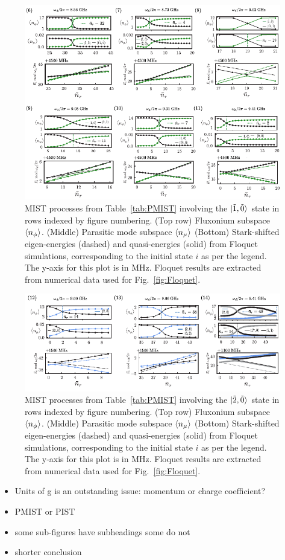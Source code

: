 \documentclass[%
reprint,
superscriptaddress,
 amsmath,amssymb,
 aps,
 prx,
longbibliography,
floatfix,
]{revtex4-2}
\begin{document}
\begin{figure}
    \centering
    \includegraphics[width=1.0\textwidth]{Supp_Fig/Trans1.pdf}
    \caption{MIST processes from Table~\ref{tab:PMIST} involving the $\ket{\tilde{1},\tilde{0}}$ state in rows indexed by figure numbering. (Top row) Fluxonium subspace $\braket{n_\phi}$. (Middle) Parasitic mode subspace $\braket{n_\mu}$ (Bottom) Stark-shifted eigen-energies (dashed) and quasi-energies (solid) from Floquet simulations, corresponding to the initial state $i$ as per the legend. The y-axis for this plot is in MHz. Floquet results are extracted from numerical data used for Fig.~\ref{fig:Floquet}.}
    \label{fig:Trans1}
\end{figure}
\begin{figure}
    \centering
    \includegraphics[width=1.0\textwidth]{Supp_Fig/Trans2.pdf}
    \caption{MIST processes from Table~\ref{tab:PMIST} involving the $\ket{\tilde{2},\tilde{0}}$ state in rows indexed by figure numbering. (Top row) Fluxonium subspace $\braket{n_\phi}$. (Middle) Parasitic mode subspace $\braket{n_\mu}$ (Bottom) Stark-shifted eigen-energies (dashed) and quasi-energies (solid) from Floquet simulations, corresponding to the initial state $i$ as per the legend. The y-axis for this plot is in MHz. Floquet results are extracted from numerical data used for Fig.~\ref{fig:Floquet}.}
    \label{fig:Trans2}
\end{figure}

\clearpage
\begin{itemize}
    \item Units of g is an outstanding issue: momentum or charge coefficient?
    \item PMIST or PIST
    \item some sub-figures have subheadings some do not
    \item shorter conclusion
\end{itemize}
\clearpage
 
\end{document}
